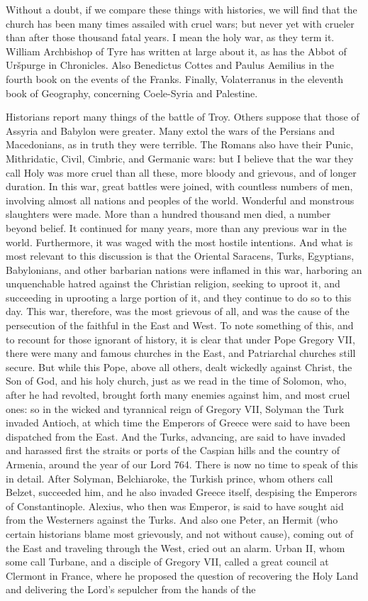 Without a doubt, if we compare these things with histories, we will find that the church has been many times assailed with cruel wars; but never yet with crueler than after those thousand fatal years. I mean the holy war, as they term it. William Archbishop of Tyre has written at large about it, as has the Abbot of Uršpurge in Chronicles. Also Benedictus Cottes and Paulus Aemilius in the fourth book on the events of the Franks. Finally, Volaterranus in the eleventh book of Geography, concerning Coele-Syria and Palestine.

Historians report many things of the battle of Troy. Others suppose that those of Assyria and Babylon were greater. Many extol the wars of the Persians and Macedonians, as in truth they were terrible. The Romans also have their Punic, Mithridatic, Civil, Cimbric, and Germanic wars: but I believe that the war they call Holy was more cruel than all these, more bloody and grievous, and of longer duration. In this war, great battles were joined, with countless numbers of men, involving almost all nations and peoples of the world. Wonderful and monstrous slaughters were made. More than a hundred thousand men died, a number beyond belief. It continued for many years, more than any previous war in the world. Furthermore, it was waged with the most hostile intentions. And what is most relevant to this discussion is that the Oriental Saracens, Turks, Egyptians, Babylonians, and other barbarian nations were inflamed in this war, harboring an unquenchable hatred against the Christian religion, seeking to uproot it, and succeeding in uprooting a large portion of it, and they continue to do so to this day. This war, therefore, was the most grievous of all, and was the cause of the persecution of the faithful in the East and West. To note something of this, and to recount for those ignorant of history, it is clear that under Pope Gregory VII, there were many and famous churches in the East, and Patriarchal churches still secure. But while this Pope, above all others, dealt wickedly against Christ, the Son of God, and his holy church, just as we read in the time of Solomon, who, after he had revolted, brought forth many enemies against him, and most cruel ones: so in the wicked and tyrannical reign of Gregory VII, Solyman the Turk invaded Antioch, at which time the Emperors of Greece were said to have been dispatched from the East. And the Turks, advancing, are said to have invaded and harassed first the straits or ports of the Caspian hills and the country of Armenia, around the year of our Lord 764. There is now no time to speak of this in detail. After Solyman, Belchiaroke, the Turkish prince, whom others call Belzet, succeeded him, and he also invaded Greece itself, despising the Emperors of Constantinople. Alexius, who then was Emperor, is said to have sought aid from the Westerners against the Turks. And also one Peter, an Hermit (who certain historians blame most grievously, and not without cause), coming out of the East and traveling through the West, cried out an alarm. Urban II, whom some call Turbane, and a disciple of Gregory VII, called a great council at Clermont in France, where he proposed the question of recovering the Holy Land and delivering the Lord’s sepulcher from the hands of the 
